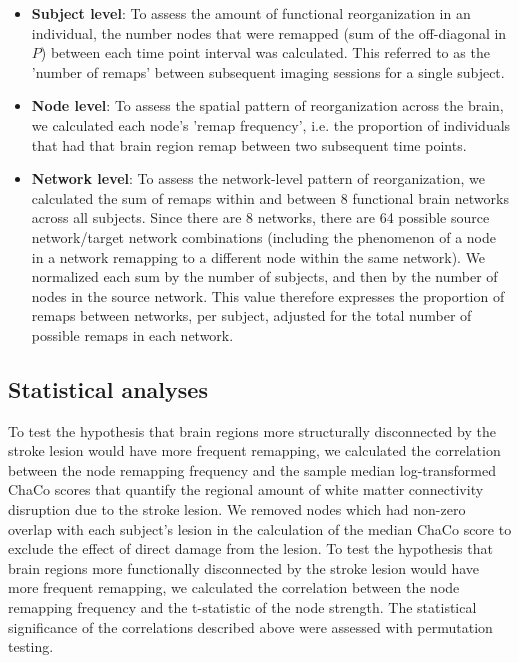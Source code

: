 \documentclass[phd,tocprelim]{cornell}
\begin{document}
	\begin{itemize}
	 \item \textbf{Subject level}: To assess the amount of functional reorganization in an individual, the number nodes that were remapped (sum of the off-diagonal in $P$) between each time point interval was calculated. This referred to as the 'number of remaps' between subsequent imaging sessions for a single subject.
	 
	 \item \textbf{Node level}: To assess the spatial pattern of reorganization across the brain, we calculated each node's 'remap frequency', i.e. the proportion of individuals that had that brain region remap between two subsequent time points.
	 
	 \item \textbf{Network level}: To assess the network-level pattern of reorganization, we calculated the sum of remaps within and between 8 functional brain networks across all subjects. Since there are 8 networks, there are 64 possible source network/target network combinations (including the phenomenon of a node in a network remapping to a different node within the same network). We normalized each sum by the number of subjects, and then by the number of nodes in the source network. This value therefore expresses the proportion of remaps between networks, per subject, adjusted for the total number of possible remaps in each network. 
	\end{itemize}

	\subsection{Statistical analyses}
	To test the hypothesis that brain regions more structurally disconnected by the stroke lesion would have more frequent remapping, we calculated the correlation between the node remapping frequency and the sample median log-transformed ChaCo scores that quantify the regional amount of white matter connectivity disruption due to the stroke lesion. We removed nodes which had non-zero overlap with each subject's lesion in the calculation of the median ChaCo score to exclude the effect of direct damage from the lesion. To test the hypothesis that brain regions more functionally disconnected by the stroke lesion would have more frequent remapping, we calculated the correlation between the node remapping frequency and the t-statistic of the node strength. The statistical significance of the correlations described above were assessed with permutation testing. 
	
\end{document}
